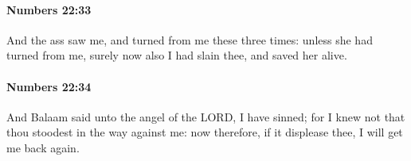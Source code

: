 		\paragraph{Numbers 22:33} %
			\label{NUMBERS-22-33}

			And the ass saw me, and turned from me these three times: unless she had turned from me, surely now also I had slain thee, and saved her alive.


		\paragraph{Numbers 22:34} %
			\label{NUMBERS-22-34}

			And Balaam said unto the angel of the LORD, I have sinned; for I knew not that thou stoodest in the way against me: now therefore, if it displease thee, I will get me back again.


